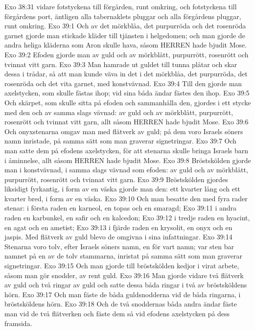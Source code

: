 Exo 38:31  vidare fotstyckena till förgården, runt omkring, och fotstyckena till förgårdens port, äntligen alla tabernaklets pluggar och alla förgårdens pluggar, runt omkring.
Exo 39:1  Och av det mörkblåa, det purpurröda och det rosenröda garnet gjorde man stickade kläder till tjänsten i helgedomen; och man gjorde de andra heliga kläderna som Aron skulle hava, såsom HERREN hade bjudit Mose.
Exo 39:2  Efoden gjorde man av guld och av mörkblått, purpurrött, rosenrött och tvinnat vitt garn.
Exo 39:3  Man hamrade ut guldet till tunna plåtar och skar dessa i trådar, så att man kunde väva in det i det mörkblåa, det purpurröda, det rosenröda och det vita garnet, med konstvävnad.
Exo 39:4  Till den gjorde man axelstycken, som skulle fästas ihop; vid sina båda ändar fästes den ihop.
Exo 39:5  Och skärpet, som skulle sitta på efoden och sammanhålla den, gjordes i ett stycke med den och av samma slags vävnad: av guld och av mörkblått, purpurrött, rosenrött och tvinnat vitt garn, allt såsom HERREN hade bjudit Mose.
Exo 39:6  Och onyxstenarna omgav man med flätverk av guld; på dem voro Israels söners namn inristade, på samma sätt som man graverar signetringar.
Exo 39:7  Och man satte dem på efodens axelstycken, för att stenarna skulle bringa Israels barn i åminnelse, allt såsom HERREN hade bjudit Mose.
Exo 39:8  Bröstskölden gjorde man i konstvävnad, i samma slags vävnad som efoden: av guld och av mörkblått, purpurrött, rosenrött och tvinnat vitt garn.
Exo 39:9  Bröstskölden gjordes liksidigt fyrkantig, i form av en väska gjorde man den: ett kvarter lång och ett kvarter bred, i form av en väska.
Exo 39:10  Och man besatte den med fyra rader stenar: i första raden en karneol, en topas och en smaragd;
Exo 39:11  i andra raden en karbunkel, en safir och en kalcedon;
Exo 39:12  i tredje raden en hyacint, en agat och en ametist;
Exo 39:13  i fjärde raden en krysolit, en onyx och en jaspis. Med flätverk av guld blevo de omgivna i sina infattningar.
Exo 39:14  Stenarna voro tolv, efter Israels söners namn, en för vart namn; var sten bar namnet på en av de tolv stammarna, inristat på samma sätt som man graverar signetringar.
Exo 39:15  Och man gjorde till bröstskölden kedjor i virat arbete, såsom man gör snodder, av rent guld.
Exo 39:16  Man gjorde vidare två flätverk av guld och två ringar av guld och satte dessa båda ringar i två av bröstsköldens hörn.
Exo 39:17  Och man fäste de båda guldsnodderna vid de båda ringarna, i bröstsköldens hörn.
Exo 39:18  Och de två snoddernas båda andra ändar fäste man vid de två flätverken och fäste dem så vid efodens axelstycken på dess framsida.
